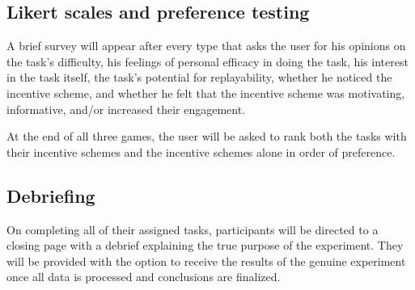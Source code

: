 \subsection{Likert scales and preference testing}

A brief survey will appear after every type that asks the user for his opinions on the task’s difficulty, his feelings of personal efficacy in doing the task, his interest in the task itself, the task’s potential for replayability, whether he noticed the incentive scheme, and whether he felt that the incentive scheme was motivating, informative, and/or increased their engagement.

At the end of all three games, the user will be asked to rank both the tasks with their incentive schemes and the incentive schemes alone in order of preference.

\subsection{Debriefing}
On completing all of their assigned tasks, participants will be directed to a closing page with a debrief explaining the true purpose of the experiment. They will be provided with the option to receive the results of the genuine experiment once all data is processed and conclusions are finalized.
